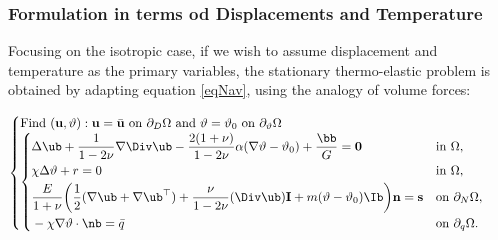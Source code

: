\subsubsection{Formulation in terms od Displacements and Temperature}
Focusing on the isotropic case, if we wish to assume displacement and temperature as the primary variables, the stationary thermo-elastic problem is obtained by adapting equation \eqref{eqNav}, using the analogy of volume forces:
\begin{definition}
	\begin{equation}
		\begin{cases}
			\mathrm{Find~}(\mathbf{u},\vartheta): \mathbf{u}=\bar{\mathbf{u}}\mathrm{~on~}\partial_D\Omega\mathrm{~and~} \vartheta=\vartheta_0\mathrm{~on~}\partial_\vartheta\Omega\\
			\begin{cases}
				\begin{aligned}
					&\Delta \ub + \frac{1}{1-2\nu}\nabla \Div \ub - \frac{2(1+\nu)}{1-2\nu}\alpha(\nabla\vartheta - \vartheta_0) + \frac{\bb}{G} = \mathbf{0}  \quad &&\mathrm{in~}\Omega,\\
					&\chi \Delta \vartheta + r = 0  \quad &&\mathrm{in~}\Omega,\\
					&\frac{E}{1+\nu}{\left(\frac12(\nabla \ub + \nabla \ub^\top) + \frac{\nu}{1-2\nu}(\Div \ub)\mathbf{I} + m(\vartheta - \vartheta_0)\Ib \right)}\mathbf{n} = \mathbf{s} &&\mathrm{on~}\partial_N\Omega,\\
					&-\chi \nabla \vartheta \cdot \nb = \bar{q} &&\mathrm{on~}\partial_q\Omega.
				\end{aligned}
			\end{cases}
		\end{cases}
	\end{equation}
\end{definition}


